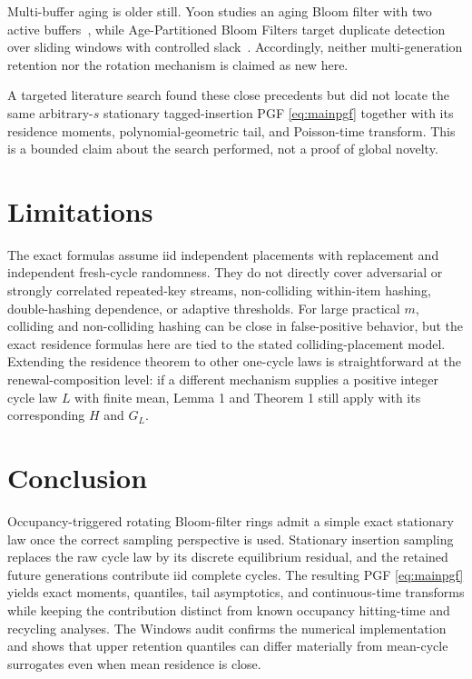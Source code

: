 \documentclass[11pt]{article}
\begin{document}
Multi-buffer aging is older still. Yoon studies an aging Bloom filter with two active buffers~\cite{yoon2010}, while Age-Partitioned Bloom Filters target duplicate detection over sliding windows with controlled slack~\cite{shtul2020}. Accordingly, neither multi-generation retention nor the rotation mechanism is claimed as new here.

A targeted literature search found these close precedents but did not locate the same arbitrary-$s$ stationary tagged-insertion PGF \eqref{eq:mainpgf} together with its residence moments, polynomial-geometric tail, and Poisson-time transform. This is a bounded claim about the search performed, not a proof of global novelty.

\section{Limitations}
The exact formulas assume iid independent placements with replacement and independent fresh-cycle randomness. They do not directly cover adversarial or strongly correlated repeated-key streams, non-colliding within-item hashing, double-hashing dependence, or adaptive thresholds. For large practical $m$, colliding and non-colliding hashing can be close in false-positive behavior, but the exact residence formulas here are tied to the stated colliding-placement model. Extending the residence theorem to other one-cycle laws is straightforward at the renewal-composition level: if a different mechanism supplies a positive integer cycle law $L$ with finite mean, Lemma 1 and Theorem 1 still apply with its corresponding $H$ and $G_L$.

\section{Conclusion}
Occupancy-triggered rotating Bloom-filter rings admit a simple exact stationary law once the correct sampling perspective is used. Stationary insertion sampling replaces the raw cycle law by its discrete equilibrium residual, and the retained future generations contribute iid complete cycles. The resulting PGF \eqref{eq:mainpgf} yields exact moments, quantiles, tail asymptotics, and continuous-time transforms while keeping the contribution distinct from known occupancy hitting-time and recycling analyses. The Windows audit confirms the numerical implementation and shows that upper retention quantiles can differ materially from mean-cycle surrogates even when mean residence is close.
\end{document}
